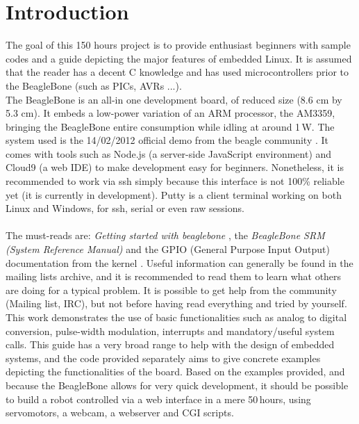 \chapter{Introduction}

The goal of this 150 hours project is to provide enthusiast beginners with sample codes and a guide depicting the major features of embedded Linux. It is assumed that the reader has a decent C knowledge and has used microcontrollers prior to the BeagleBone (such as PICs, AVRs ...).
\\
The BeagleBone is an all-in one development board, of reduced size (8.6 cm by 5.3 cm). It embeds a low-power variation of an ARM processor, the AM3359, bringing the BeagleBone entire consumption while idling at around 1\,W. The system used is the 14/02/2012 official demo from the beagle community \cite{agimg}. It comes with tools such as Node.js (a server-side JavaScript environment) and Cloud9 (a web IDE) to make development easy for beginners. Nonetheless, it is recommended to work via ssh simply because this interface is not 100\% reliable yet (it is currently in development). Putty\cite{putty} is a client terminal working on both Linux and Windows, for ssh, serial or even raw sessions.
\\
\\
The must-reads are: \textit{Getting started with beaglebone} \cite{bbgts}, the \textit{BeagleBone SRM (System Reference Manual)} \cite{bbsrm} and the GPIO (General Purpose Input Output) documentation from the kernel \cite{kgpio}. Useful information can generally be found in the mailing lists archive, and it is recommended to read them to learn what others are doing for a typical problem. It is possible to get help from the community (Mailing list, IRC), but not before having read everything and tried by yourself.
\\
This work demonstrates the use of basic functionalities such as analog to digital conversion, pulse-width modulation, interrupts and mandatory/useful system calls. This guide has a very broad range to help with the design of embedded systems, and the code provided separately aims to give concrete examples depicting the functionalities of the board. Based on the examples provided, and because the BeagleBone allows for very quick development, it should be possible to build a robot controlled via a web interface in a mere 50\,hours, using servomotors, a webcam, a webserver and CGI scripts.

